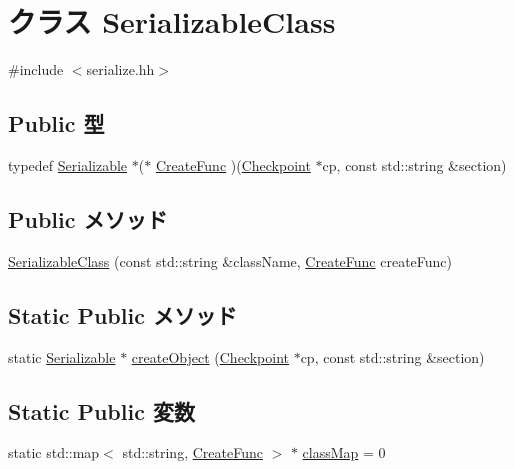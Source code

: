 \hypertarget{classSerializableClass}{
\section{クラス SerializableClass}
\label{classSerializableClass}
}


{\ttfamily \#include $<$serialize.hh$>$}\subsection*{Public 型}
\begin{DoxyCompactItemize}
\item 
typedef \hyperlink{classSerializable}{Serializable} $\ast$($\ast$ \hyperlink{classSerializableClass_a4380a9efd91eaed365bb34416792b6b3}{CreateFunc} )(\hyperlink{classCheckpoint}{Checkpoint} $\ast$cp, const std::string \&section)
\end{DoxyCompactItemize}
\subsection*{Public メソッド}
\begin{DoxyCompactItemize}
\item 
\hyperlink{classSerializableClass_a3b694007e46d2f4fe651c5b2572d5595}{SerializableClass} (const std::string \&className, \hyperlink{classSerializableClass_a4380a9efd91eaed365bb34416792b6b3}{CreateFunc} createFunc)
\end{DoxyCompactItemize}
\subsection*{Static Public メソッド}
\begin{DoxyCompactItemize}
\item 
static \hyperlink{classSerializable}{Serializable} $\ast$ \hyperlink{classSerializableClass_a5eff49a2a3d98b8edff0de1193dc231c}{createObject} (\hyperlink{classCheckpoint}{Checkpoint} $\ast$cp, const std::string \&section)
\end{DoxyCompactItemize}
\subsection*{Static Public 変数}
\begin{DoxyCompactItemize}
\item 
static std::map$<$ std::string, \hyperlink{classSerializableClass_a4380a9efd91eaed365bb34416792b6b3}{CreateFunc} $>$ $\ast$ \hyperlink{classSerializableClass_a9f05a150a55145281d93afd0119f2192}{classMap} = 0
\end{DoxyCompactItemize}


